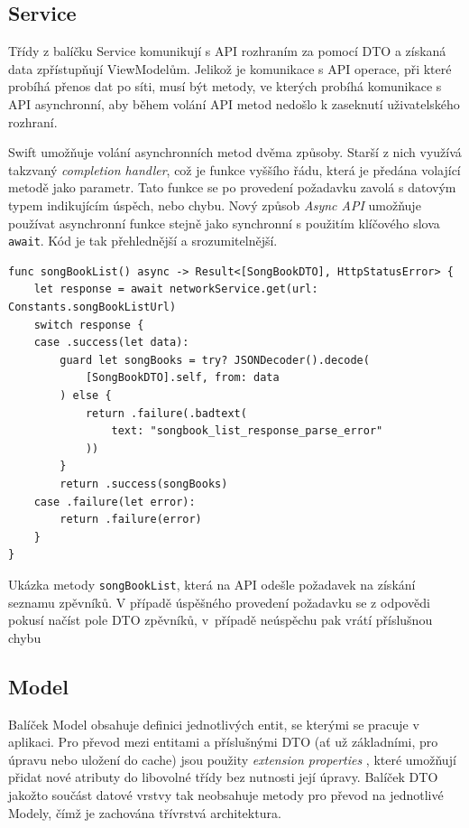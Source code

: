 \subsection{Service}

Třídy z balíčku Service komunikují s API rozhraním za pomocí DTO a získaná data zpřístupňují ViewModelům. Jelikož je komunikace s API operace, při které probíhá přenos dat po síti, musí být metody, ve kterých probíhá komunikace s API asynchronní, aby během volání API metod nedošlo k zaseknutí uživatelského rozhraní.

Swift umožňuje volání asynchronních metod dvěma způsoby. Starší z nich využívá takzvaný \textit{completion handler}, což je funkce vyššího řádu, která je předána volající metodě jako parametr. Tato funkce se po provedení požadavku zavolá s datovým typem indikujícím úspěch, nebo chybu. Nový způsob \textit{Async API} umožňuje používat asynchronní funkce stejně jako synchronní s použitím klíčového slova \texttt{await}. Kód je tak přehlednější a srozumitelnější. \cite{swift-async-completion}

\begin{listing}[H]
\begin{verbatim}
func songBookList() async -> Result<[SongBookDTO], HttpStatusError> {
    let response = await networkService.get(url: Constants.songBookListUrl)
    switch response {
    case .success(let data):
        guard let songBooks = try? JSONDecoder().decode(
            [SongBookDTO].self, from: data
        ) else {
            return .failure(.badtext(
                text: "songbook_list_response_parse_error"
            ))
        }
        return .success(songBooks)
    case .failure(let error):
        return .failure(error)
    }
}
\end{verbatim}
\caption[Ukázka Service pro zpěvníky v aplikaci]{Ukázka metody \texttt{songBookList}, která na API odešle požadavek na získání seznamu zpěvníků. V případě úspěšného provedení požadavku se z odpovědi pokusí načíst pole DTO zpěvníků, v~případě neúspěchu pak vrátí příslušnou chybu}
\end{listing}

\subsection{Model}

Balíček Model obsahuje definici jednotlivých entit, se kterými se pracuje v aplikaci. Pro převod mezi entitami a příslušnými DTO (ať už základními, pro úpravu nebo uložení do cache) jsou použity \textit{extension properties} \cite{swift-extensions}, které umožňují přidat nové atributy do libovolné třídy bez nutnosti její úpravy. Balíček DTO jakožto součást datové vrstvy tak neobsahuje metody pro převod na jednotlivé Modely, čímž je zachována třívrstvá architektura.

